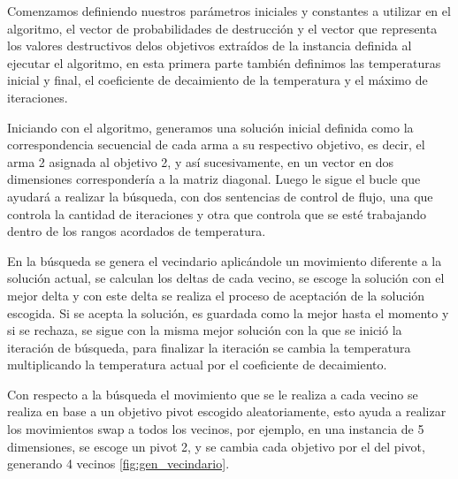 Comenzamos definiendo nuestros parámetros iniciales y constantes a utilizar en el algoritmo, el vector de probabilidades de destrucción y el vector que representa los valores destructivos delos objetivos extraídos de la instancia definida al ejecutar el algoritmo, en esta primera parte también definimos las temperaturas inicial y final, el coeficiente de decaimiento de la temperatura y el máximo de iteraciones.

Iniciando con el algoritmo, generamos una solución inicial definida como la correspondencia secuencial de cada arma a su respectivo objetivo, es decir, el arma 2 asignada al objetivo 2, y así sucesivamente, en un vector en dos dimensiones correspondería a la matriz diagonal.
Luego le sigue el bucle que ayudará a realizar la búsqueda, con dos sentencias de control de flujo, una que controla la cantidad de iteraciones y otra que controla que se esté trabajando dentro de los rangos acordados de temperatura.

En la búsqueda se genera el vecindario aplicándole un movimiento diferente a la solución actual, se calculan los deltas de cada vecino, se escoge la solución con el mejor delta y con este delta se realiza el proceso de aceptación de la solución escogida. Si se acepta la solución, es guardada como la mejor hasta el momento y si se rechaza, se sigue con la misma mejor solución con la que se inició la iteración de búsqueda, para finalizar la iteración se cambia la temperatura multiplicando la temperatura actual por el coeficiente de decaimiento.

Con respecto a la búsqueda el movimiento que se le realiza a cada vecino se realiza en base a un objetivo pivot escogido aleatoriamente, esto ayuda a realizar los movimientos swap a todos los vecinos, por ejemplo, en una instancia de 5 dimensiones, se escoge un pivot 2, y se cambia cada objetivo por el del pivot, generando 4 vecinos \ref{fig:gen_vecindario}.



